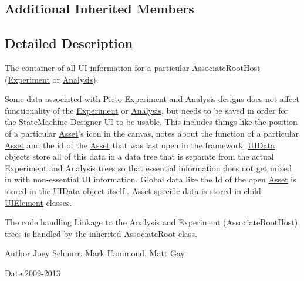 \subsection*{Additional Inherited Members}


\subsection{Detailed Description}
The container of all U\-I information for a particular \hyperlink{class_picto_1_1_associate_root_host}{Associate\-Root\-Host} (\hyperlink{class_picto_1_1_experiment}{Experiment} or \hyperlink{class_picto_1_1_analysis}{Analysis}). 

Some data associated with \hyperlink{namespace_picto}{Picto} \hyperlink{class_picto_1_1_experiment}{Experiment} and \hyperlink{class_picto_1_1_analysis}{Analysis} designs does not affect functionality of the \hyperlink{class_picto_1_1_experiment}{Experiment} or \hyperlink{class_picto_1_1_analysis}{Analysis}, but needs to be saved in order for the \hyperlink{class_picto_1_1_state_machine}{State\-Machine} \hyperlink{class_designer}{Designer} U\-I to be usable. This includes things like the position of a particular \hyperlink{class_picto_1_1_asset}{Asset}'s icon in the canvas, notes about the function of a particular \hyperlink{class_picto_1_1_asset}{Asset} and the id of the \hyperlink{class_picto_1_1_asset}{Asset} that was last open in the framework. \hyperlink{class_picto_1_1_u_i_data}{U\-I\-Data} objects store all of this data in a data tree that is separate from the actual \hyperlink{class_picto_1_1_experiment}{Experiment} and \hyperlink{class_picto_1_1_analysis}{Analysis} trees so that essential information does not get mixed in with non-\/essential U\-I information. Global data like the Id of the open \hyperlink{class_picto_1_1_asset}{Asset} is stored in the \hyperlink{class_picto_1_1_u_i_data}{U\-I\-Data} object itself,. \hyperlink{class_picto_1_1_asset}{Asset} specific data is stored in child \hyperlink{class_picto_1_1_u_i_element}{U\-I\-Element} classes.

The code handling Linkage to the \hyperlink{class_picto_1_1_analysis}{Analysis} and \hyperlink{class_picto_1_1_experiment}{Experiment} (\hyperlink{class_picto_1_1_associate_root_host}{Associate\-Root\-Host}) trees is handled by the inherited \hyperlink{class_picto_1_1_associate_root}{Associate\-Root} class. \begin{DoxyAuthor}{Author}
Joey Schnurr, Mark Hammond, Matt Gay 
\end{DoxyAuthor}
\begin{DoxyDate}{Date}
2009-\/2013 
\end{DoxyDate}


